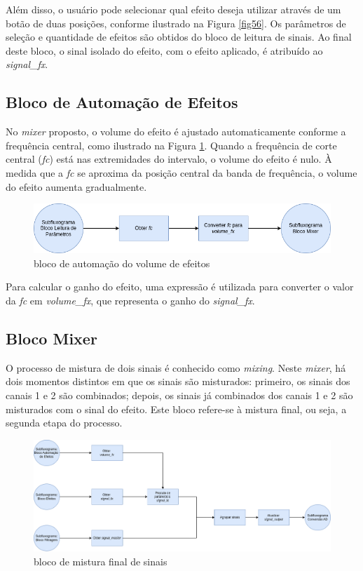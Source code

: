 Além disso, o usuário pode selecionar qual efeito deseja utilizar através de um botão de duas posições, conforme ilustrado na Figura \ref{fig56}. Os parâmetros de seleção e quantidade de efeitos são obtidos do bloco de leitura de sinais. Ao final deste bloco, o sinal isolado do efeito, com o efeito aplicado, é atribuído ao \textit{signal\_fx}.

\subsection{Bloco de Automação de Efeitos}

No \textit{mixer} proposto, o volume do efeito é ajustado automaticamente conforme a frequência central, como ilustrado na Figura \ref{fig57}. Quando a frequência de corte central (\textit{fc}) está nas extremidades do intervalo, o volume do efeito é nulo. À medida que a \textit{fc} se aproxima da posição central da banda de frequência, o volume do efeito aumenta gradualmente.

\begin{figure}[h]
    \centering
    \includegraphics[width=\textwidth]{figuras/fig57.png}
    \caption{bloco de automação do volume de efeitos}
    \label{fig57}
\end{figure}

Para calcular o ganho do efeito, uma expressão é utilizada para converter o valor da \textit{fc} em \textit{volume\_fx}, que representa o ganho do \textit{signal\_fx}.

\subsection{Bloco Mixer}

O processo de mistura de dois sinais é conhecido como \textit{mixing}. Neste \textit{mixer}, há dois momentos distintos em que os sinais são misturados: primeiro, os sinais dos canais 1 e 2 são combinados; depois, os sinais já combinados dos canais 1 e 2 são misturados com o sinal do efeito. Este bloco refere-se à mistura final, ou seja, a segunda etapa do processo.

\begin{figure}[h]
    \centering
    \includegraphics[width=\textwidth]{figuras/fig58.png}
    \caption{bloco de mistura final de sinais}
    \label{fig58}
\end{figure}

